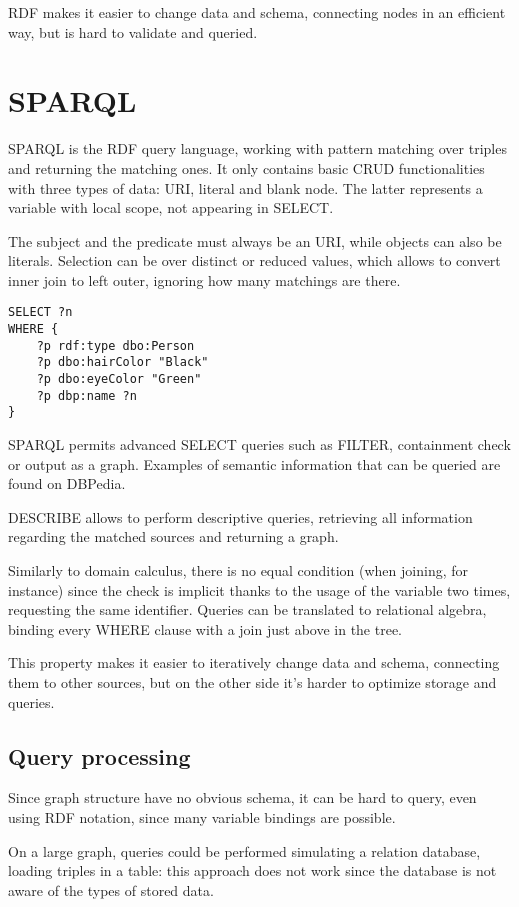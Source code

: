 RDF makes it easier to change data and schema, connecting nodes in an efficient way, but is hard to validate and queried.

\section{SPARQL}
SPARQL is the RDF query language, working with pattern matching over triples and returning the matching ones. It only contains basic CRUD functionalities with three types of data: URI, literal and blank node. The latter represents a variable with local scope, not appearing in SELECT.

The subject and the predicate must always be an URI, while objects can also be literals. Selection can be over distinct or reduced values, which allows to convert inner join to left outer, ignoring how many matchings are there.

\begin{lstlisting}
SELECT ?n
WHERE {
	?p rdf:type dbo:Person
	?p dbo:hairColor "Black"
	?p dbo:eyeColor "Green"
	?p dbp:name ?n
}
\end{lstlisting}

SPARQL permits advanced SELECT queries such as FILTER, containment check or output as a graph. Examples of semantic information that can be queried are found on DBPedia.

DESCRIBE allows to perform descriptive queries, retrieving all information regarding the matched sources and returning a graph.

Similarly to domain calculus, there is no equal condition (when joining, for instance) since the check is implicit thanks to the usage of the variable two times, requesting the same identifier. Queries can be translated to relational algebra, binding every WHERE clause with a join just above in the tree.

This property makes it easier to iteratively change data and schema, connecting them to other sources, but on the other side it's harder to optimize storage and queries.

\subsection{Query processing}
Since graph structure have no obvious schema, it can be hard to query, even using RDF notation, since many variable bindings are possible. 

On a large graph, queries could be performed simulating a relation database, loading triples in a table: this approach does not work since the database is not aware of the types of stored data. 

